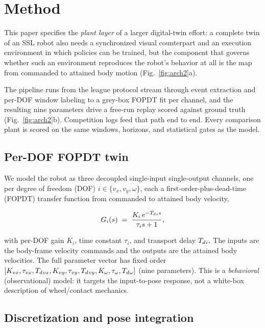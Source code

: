 \section{Method}
\label{sec:method}



This paper specifies the \emph{plant layer} of a larger digital-twin effort: a complete twin of an SSL robot also needs a synchronized visual counterpart and an execution environment in which policies can be trained, but the component that governs whether such an environment reproduces the robot's behavior at all is the map from commanded to attained body motion (Fig.~\ref{fig:arch2}a).

The pipeline runs from the league protocol stream through event extraction and per-DOF window labeling to a grey-box FOPDT fit per channel, and the resulting nine parameters drive a free-run replay scored against ground truth (Fig.~\ref{fig:arch2}b). Competition logs feed that path end to end. Every comparison plant is scored on the same windows, horizons, and statistical gates as the model.

\subsection{Per-DOF FOPDT twin}
\label{sec:method:model}
We model the robot as three decoupled single-input single-output channels, one per degree of freedom (DOF) $i\in\{v_x, v_y, \omega\}$, each a first-order-plus-dead-time (FOPDT) transfer function from commanded to attained body velocity,

\begin{equation}
  G_i(s) \;=\; \frac{K_i\, e^{-T_{d}{}_i s}}{\tau_i s + 1},
  \label{eq:fopdt}
\end{equation}

with per-DOF gain $K_i$, time constant $\tau_i$, and transport delay $T_{d}{}_i$. The inputs are the body-frame velocity commands and the outputs are the attained body velocities. The full parameter vector has fixed order $[K_{vx},\tau_{vx},T_{d}{}_{vx},K_{vy},\tau_{vy},T_{d}{}_{vy},K_{\omega},\tau_{\omega},T_{d}{}_{\omega}]$
(nine parameters). %
This is a \emph{behavioral} (observational) model: it targets the input-to-pose
response, not a white-box description of wheel/contact mechanics.

\subsection{Discretization and pose integration}
\label{sec:method:disc}


